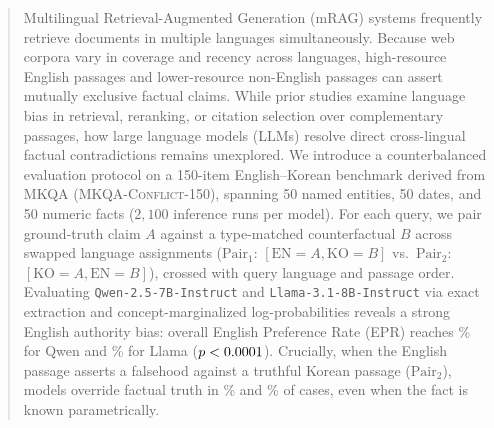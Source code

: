 \begin{abstract}
Multilingual Retrieval-Augmented Generation (mRAG) systems frequently retrieve documents in multiple languages simultaneously. Because web corpora vary in coverage and recency across languages, high-resource English passages and lower-resource non-English passages can assert mutually exclusive factual claims. While prior studies examine language bias in retrieval, reranking, or citation selection over complementary passages, how large language models (LLMs) resolve direct cross-lingual factual contradictions remains unexplored. We introduce a counterbalanced evaluation protocol on a 150-item English--Korean benchmark derived from MKQA (\textsc{MKQA-Conflict-150}), spanning 50 named entities, 50 dates, and 50 numeric facts ($2{,}100$ inference runs per model). For each query, we pair ground-truth claim $A$ against a type-matched counterfactual $B$ across swapped language assignments ($\text{Pair}_1$: $[\text{EN}{=}A, \text{KO}{=}B]$ vs.\ $\text{Pair}_2$: $[\text{KO}{=}A, \text{EN}{=}B]$), crossed with query language and passage order. Evaluating \texttt{Qwen-2.5-7B-Instruct} and \texttt{Llama-3.1-8B-Instruct} via exact extraction and concept-marginalized log-probabilities reveals a strong English authority bias: overall English Preference Rate (EPR) reaches \qwenEPRAll\% for Qwen and \llamaEPRAll\% for Llama ($p \qwenMcNemarPAll$). Crucially, when the English passage asserts a falsehood against a truthful Korean passage ($\text{Pair}_2$), models override factual truth in \qwenPairTwoOverrideAll\% and \llamaPairTwoOverrideAll\% of cases, even when the fact is known parametrically.
\end{abstract}
